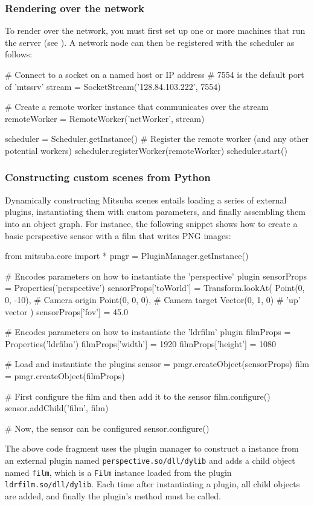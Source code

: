 \subsubsection{Rendering over the network}
To render over the network, you must first set up one or
more machines that run the  server (see ).
A network node can then be registered with the scheduler as follows:
\begin{python}
# Connect to a socket on a named host or IP address
# 7554 is the default port of 'mtssrv'
stream = SocketStream('128.84.103.222', 7554)

# Create a remote worker instance that communicates over the stream
remoteWorker = RemoteWorker('netWorker', stream)

scheduler = Scheduler.getInstance()
# Register the remote worker (and any other potential workers)
scheduler.registerWorker(remoteWorker)
scheduler.start()
\end{python}

\subsubsection{Constructing custom scenes from Python}
Dynamically constructing Mitsuba scenes entails loading a series of external
plugins, instantiating them with custom parameters, and finally assembling
them into an object graph.
For instance, the following snippet shows how to create a basic
perspective sensor with a film that writes PNG images:
\begin{python}
from mitsuba.core import *
pmgr = PluginManager.getInstance()

# Encodes parameters on how to instantiate the 'perspective' plugin
sensorProps = Properties('perspective')
sensorProps['toWorld'] = Transform.lookAt(
	Point(0, 0, -10),  # Camera origin
	Point(0, 0, 0),    # Camera target
	Vector(0, 1, 0)    # 'up' vector
)
sensorProps['fov'] = 45.0

# Encodes parameters on how to instantiate the 'ldrfilm' plugin
filmProps = Properties('ldrfilm')
filmProps['width'] = 1920
filmProps['height'] = 1080

# Load and instantiate the plugins
sensor = pmgr.createObject(sensorProps)
film = pmgr.createObject(filmProps)

# First configure the film and then add it to the sensor
film.configure()
sensor.addChild('film', film)

# Now, the sensor can be configured
sensor.configure()
\end{python}
The above code fragment uses the plugin manager to construct a
 instance from an external plugin named
\texttt{perspective.so/dll/dylib} and adds a child object
named \texttt{film}, which is a \texttt{Film} instance loaded from the
plugin \texttt{ldrfilm.so/dll/dylib}.
Each time after instantiating a plugin, all child objects are added, and
finally the  plugin's  method must be called.


